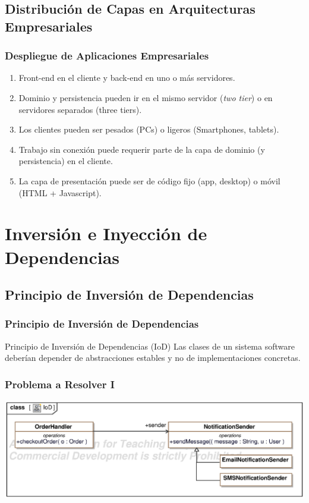 \documentclass[a4paper,t,xcolor=pst,dvips,colortheme]{beamer}
\begin{document}
\subsection{Distribución de Capas en Arquitecturas Empresariales}

\begin{frame}[c]
	\frametitle{Despliegue de Aplicaciones Empresariales}
	\begin{enumerate}[<+->]
        \item Front-end en el cliente y back-end en uno o más servidores.
        \item Dominio y persistencia pueden ir en el mismo servidor (\emph{two tier}) o en servidores separados (three tiers).
        \item Los clientes pueden ser pesados (PCs) o ligeros (Smartphones, tablets).
        \item Trabajo sin conexión puede requerir parte de la capa de dominio (y persistencia) en el cliente.
        \item La capa de presentación puede ser de código fijo (app, desktop) o móvil (HTML + Javascript).
	\end{enumerate}
\end{frame}

\section{Inversión e Inyección de Dependencias}

\subsection{Principio de Inversión de Dependencias}

\begin{frame}[c]
	\frametitle{Principio de Inversión de Dependencias}
    \begin{block}{Principio de Inversión de Dependencias (IoD)}
        Las clases de un sistema software deberían depender de abstracciones estables y no de implementaciones concretas.
    \end{block}
\end{frame}

\begin{frame}[c]
	\frametitle{Problema a Resolver I}
	\begin{center}
        \includegraphics[width=\linewidth,keepaspectratio=true]{images/IoD/IoD.eps}
	\end{center}
\end{frame}
\end{document}
